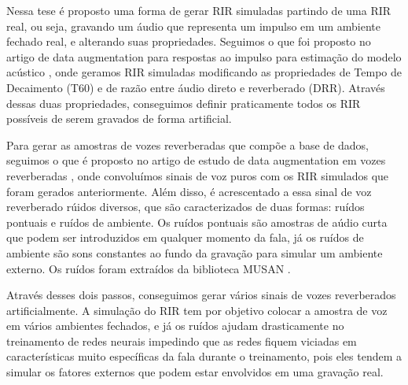 \documentclass{article}
\begin{document}
Nessa tese é proposto uma forma de gerar RIR simuladas partindo de uma RIR real, ou seja,
gravando um áudio que representa um impulso em um ambiente fechado real, e alterando
suas propriedades. Seguimos o que foi proposto no artigo de data augmentation
para respostas ao impulso para estimação do modelo acústico \cite{RIR_Data_Aug}, onde
geramos RIR simuladas modificando as propriedades de Tempo de Decaimento (T60) e de
razão entre áudio direto e reverberado (DRR). Através dessas duas propriedades, conseguimos
definir praticamente todos os RIR possíveis de serem gravados de forma artificial.

Para gerar as amostras de vozes reverberadas que compõe a base de dados, seguimos o
que é proposto no artigo de estudo de data augmentation em vozes reverberadas
\cite{Speech_Rec}, onde convoluímos sinais de voz puros com os RIR simulados que 
foram gerados anteriormente. Além disso, é acrescentado a essa sinal de voz reverberado
rúidos diversos, que são caracterizados de duas formas: ruídos pontuais e ruídos de ambiente.
Os ruídos pontuais são amostras de aúdio curta que podem ser introduzidos em qualquer momento
da fala, já os ruídos de ambiente são sons constantes ao fundo da gravação para simular
um ambiente externo. Os ruídos foram extraídos da biblioteca MUSAN \cite{noiseLib}.

Através desses dois passos, conseguimos gerar vários sinais de vozes reverberados artificialmente.
A simulação do RIR tem por objetivo colocar a amostra de voz em vários ambientes fechados,
e já os ruídos ajudam drasticamente no treinamento de redes neurais impedindo que
as redes fiquem viciadas em características muito específicas da fala durante o treinamento, 
pois eles tendem a simular os fatores externos que podem estar envolvidos em uma
gravação real.

\hfill

 

\end{document}
